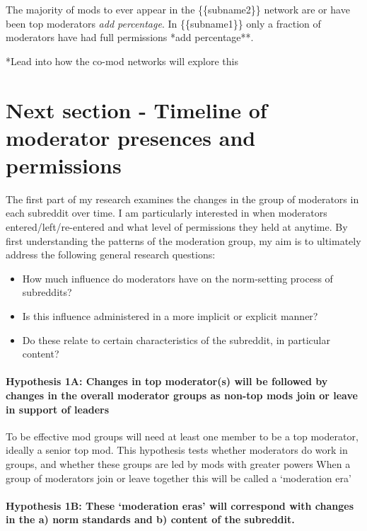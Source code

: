 \documentclass[11pt]{article}
\providecommand{\tightlist}{%
      \setlength{\itemsep}{0pt}\setlength{\parskip}{0pt}}
\begin{document}
The majority of mods to ever appear in the \{\{subname2\}\} network are
or have been top moderators \emph{add percentage}. In \{\{subname1\}\}
only a fraction of moderators have had full permissions *add
percentage**.

*Lead into how the co-mod networks will explore this

\section{Next section - Timeline of moderator presences and
permissions}\label{next-section---timeline-of-moderator-presences-and-permissions}

The first part of my research examines the changes in the group of
moderators in each subreddit over time. I am particularly interested in
when moderators entered/left/re-entered and what level of permissions
they held at anytime. By first understanding the patterns of the
moderation group, my aim is to ultimately address the following general
research questions:

\begin{itemize}
\tightlist
\item
  How much influence do moderators have on the norm-setting process of
  subreddits?
\item
  Is this influence administered in a more implicit or explicit manner?
\item
  Do these relate to certain characteristics of the subreddit, in
  particular content?
\end{itemize}

\paragraph{Hypothesis 1A: Changes in top moderator(s) will be followed
by changes in the overall moderator groups as non-top mods join or leave
in support of
leaders}\label{hypothesis-1a-changes-in-top-moderators-will-be-followed-by-changes-in-the-overall-moderator-groups-as-non-top-mods-join-or-leave-in-support-of-leaders}

To be effective mod groups will need at least one member to be a top
moderator, ideally a senior top mod. This hypothesis tests whether
moderators do work in groups, and whether these groups are led by mods
with greater powers When a group of moderators join or leave together
this will be called a `moderation era'

\paragraph{Hypothesis 1B: These `moderation eras' will correspond with
changes in the a) norm standards and b) content of the
subreddit.}\label{hypothesis-1b-these-moderation-eras-will-correspond-with-changes-in-the-a-norm-standards-and-b-content-of-the-subreddit.}
\end{document}
